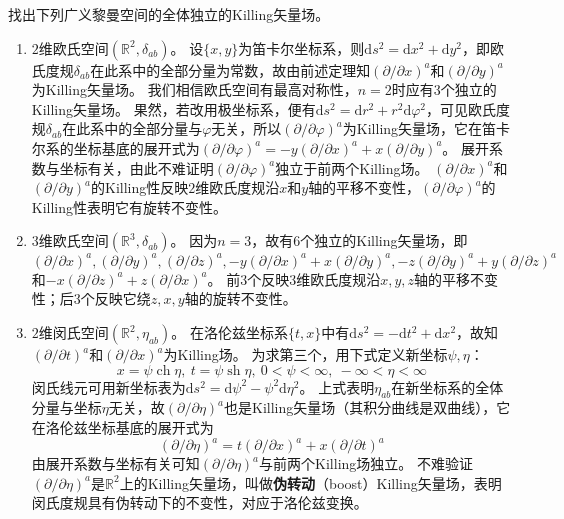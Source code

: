 \begin{example}
找出下列广义黎曼空间的全体独立的Killing矢量场。
\begin{enumerate}[（1）]
\item $2$维欧氏空间$(\mathbb{R}^2, \delta_{ab})$。
设$\{x, y\}$为笛卡尔坐标系，则$\mathrm{d}s^2 = \mathrm{d}x^2 + \mathrm{d}y^2$，即欧氏度规$\delta_{ab}$在此系中的全部分量为常数，故由前述定理知$(\partial / \partial x)^a$和$(\partial / \partial y)^a$为Killing矢量场。
我们相信欧氏空间有最高对称性，$n = 2$时应有$3$个独立的Killing矢量场。
果然，若改用极坐标系，便有$\mathrm{d}s^2 = \mathrm{d}r^2 + r^2\mathrm{d}\varphi^2$，可见欧氏度规$\delta_{ab}$在此系中的全部分量与$\varphi$无关，所以$(\partial / \partial \varphi)^a$为Killing矢量场，它在笛卡尔系的坐标基底的展开式为$(\partial / \partial \varphi)^a = -y(\partial / \partial x)^a + x(\partial / \partial y)^a$。
展开系数与坐标有关，由此不难证明$(\partial / \partial \varphi)^a$独立于前两个Killing场。
$(\partial / \partial x)^a$和$(\partial / \partial y)^a$的Killing性反映$2$维欧氏度规沿$x$和$y$轴的平移不变性，$(\partial / \partial \varphi)^a$的Killing性表明它有旋转不变性。
\item $3$维欧氏空间$(\mathbb{R}^3, \delta_{ab})$。
因为$n = 3$，故有$6$个独立的Killing矢量场，即$(\partial / \partial x)^a, (\partial / \partial y)^a, (\partial / \partial z)^a, -y(\partial / \partial x)^a + x(\partial / \partial y)^a, -z(\partial / \partial y)^a + y(\partial / \partial z)^a$和$-x(\partial / \partial z)^a + z(\partial / \partial x)^a$。
前$3$个反映$3$维欧氏度规沿$x, y, z$轴的平移不变性；后$3$个反映它绕$z, x, y$轴的旋转不变性。
\item $2$维闵氏空间$(\mathbb{R}^2, \eta_{ab})$。
在洛伦兹坐标系$\{t, x\}$中有$\mathrm{d}s^2 = -\mathrm{d}t^2 + \mathrm{d}x^2$，故知$(\partial / \partial t)^a$和$(\partial / \partial x)^a$为Killing场。
为求第三个，用下式定义新坐标$\psi, \eta$：
$$x = \psi\operatorname{ch}\eta, ~ t = \psi\operatorname{sh}\eta, ~ 0 < \psi < \infty, ~ -\infty < \eta < \infty$$
闵氏线元可用新坐标表为$\mathrm{d}s^2 = \mathrm{d}\psi^2 - \psi^2\mathrm{d}\eta^2$。
上式表明$\eta_{ab}$在新坐标系的全体分量与坐标$\eta$无关，故$(\partial / \partial \eta)^a$也是Killing矢量场（其积分曲线是双曲线），它在洛伦兹坐标基底的展开式为
$$(\partial / \partial \eta)^a = t(\partial / \partial x)^a + x(\partial / \partial t)^a$$
由展开系数与坐标有关可知$(\partial / \partial \eta)^a$与前两个Killing场独立。
不难验证$(\partial / \partial \eta)^a$是$\mathbb{R}^2$上的Killing矢量场，叫做\textbf{伪转动}（boost）Killing矢量场，表明闵氏度规具有伪转动下的不变性，对应于洛伦兹变换。

\end{enumerate}
\end{example}
